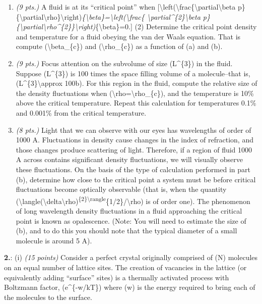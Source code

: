 \begin{enumerate}
\item \emph{(9 pts.)} A fluid is at its ``critical point'' when [\textbackslash{}left(\textbackslash{}frac\{\textbackslash{}partial\textbackslash{}beta p\}\{\textbackslash{}partial\textbackslash{}rho\}\textbackslash{}right)\emph{\{\textbackslash{}beta\}=\textbackslash{}left(\textbackslash{}frac\{ \textbackslash{}partial\^{}\{2\}\textbackslash{}beta p\}\{\textbackslash{}partial\textbackslash{}rho\^{}\{2\}\}\textbackslash{}right)}\{\textbackslash{}beta\}=0.] (2) Determine the critical point density and temperature for a fluid obeying the van der Waals equation. That is compute (\textbackslash{}beta\_\{c\}) and (\textbackslash{}rho\_\{c\}) as a function of (a) and (b).

\item \emph{(9 pts.)} Focus attention on the subvolume of size (L\^{}\{3\}) in the fluid. Suppose (L\^{}\{3\}) is 100 times the space filling volume of a molecule--that is, (L\^{}\{3\}\textbackslash{}approx 100b). For this region in the fluid, compute the relative size of the density fluctuations when (\textbackslash{}rho=\textbackslash{}rho\_\{c\}), and the temperature is 10\% above the critical temperature. Repeat this calculation for temperatures 0.1\% and 0.001\% from the critical temperature.

\item \emph{(8 pts.)} Light that we can observe with our eyes has wavelengths of order of 1000 A. Fluctuations in density cause changes in the index of refraction, and those changes produce scattering of light. Therefore, if a region of fluid 1000 A across contains significant density fluctuations, we will visually observe these fluctuations. On the basis of the type of calculation performed in part (b), determine how close to the critical point a system must be before critical fluctuations become optically observable (that is, when the quantity (\textbackslash{}langle(\textbackslash{}delta\textbackslash{}rho)\textsuperscript{\{2\}\textbackslash{}rangle}\{1\slash{}2\}\slash{}\textbackslash{}rho) is of order one). The phenomenon of long wavelength density fluctuations in a fluid approaching the critical point is known as opalescence. (Note: You will need to estimate the size of (b), and to do this you should note that the typical diameter of a small molecule is around 5 A).

\end{enumerate}

\textbf{2.}: (i) \emph{(15 points)} Consider a perfect crystal originally comprised of (N) molecules on an equal number of lattice sites. The creation of vacancies in the lattice (or equivalently adding ``surface'' sites) is a thermally activated process with Boltzmann factor, (e\^{}\{-w\slash{}kT\}) where (w) is the energy required to bring each of the molecules to the surface.

